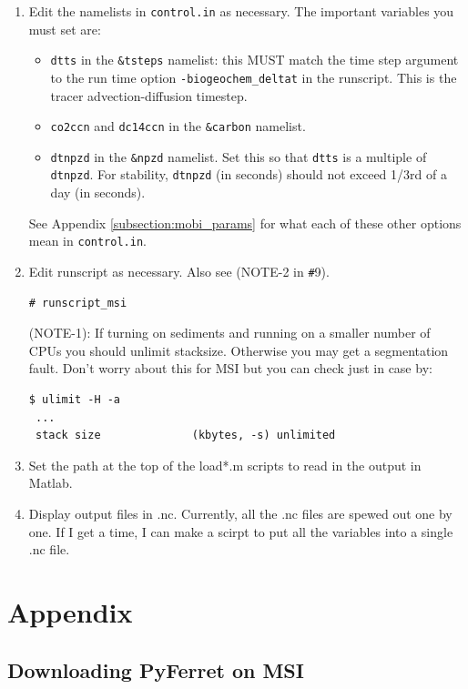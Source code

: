 \documentclass[a4paper]{article}
\def\noin{\noindent }
\begin{document}
\begin{enumerate}
\item Edit the namelists in \verb|control.in| as necessary. The important variables you 
must set are:

\begin{itemize}
\item \verb|dtts| in the \verb|&tsteps| namelist: this MUST match the time step argument to the run time option \verb|-biogeochem_deltat| in the runscript. This is the tracer advection-diffusion timestep.
\item \verb|co2ccn| and \verb|dc14ccn| in the \verb|&carbon| namelist. 
\item \verb|dtnpzd| in the \verb|&npzd| namelist. Set this so that \verb|dtts| is a multiple of \verb|dtnpzd|. For stability, \verb|dtnpzd| (in seconds) should not exceed 1/3rd of a day (in seconds). 
\end{itemize}
\noin See Appendix \ref{subsection:mobi_params} for what each of these other options mean in \verb|control.in|. 

\item Edit runscript as necessary. Also see (NOTE-2 in \verb|#|9). 
\lstset{language=sh} 
\begin{lstlisting}[frame=single,basicstyle=\scriptsize,commentstyle=\color{blue}]
 # runscript_msi
\end{lstlisting}
\noin (NOTE-1): If turning on sediments and running on a smaller number of CPUs you should unlimit stacksize. Otherwise you may get a segmentation fault. Don't worry about this for MSI but you can check just in case by:
\begin{lstlisting}[style=DOS]
 $ ulimit -H -a
 ...
 stack size              (kbytes, -s) unlimited
\end{lstlisting}

\item Set the path at the top of the load*.m scripts to read in the output in Matlab.

\item Display output files in .nc. Currently, all the .nc files are spewed out one by one. If I get a time, I can make a scirpt to put all the variables into a single .nc file. 

\end{enumerate}


\section{Appendix}

\subsection{Downloading PyFerret on MSI}
\end{document}
